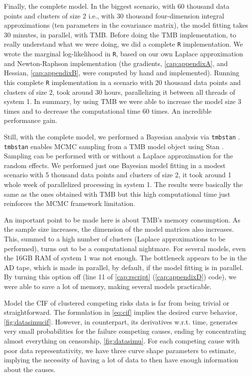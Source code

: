 Finally, the complete model. In the biggest scenario, with 60 thousand
data points and clusters of size 2 i.e., with 30 thousand four-dimension
integral approximations (ten parameters in the covariance matrix), the
model fitting takes 30 minutes, in parallel, with TMB. Before doing the
TMB implementation, to really understand what we were doing, we did a
complete \texttt{R} implementation. We wrote the marginal log-likelihood
in \texttt{R}, based on our own Laplace approximation \cite{patrao} and
Newton-Raphson implementation (the gradients, \autoref{cap:appendixA},
and Hessian, \autoref{cap:appendixB}, were computed by hand and
implemented). Running this complete \texttt{R} implementation in a
scenario with 20 thousand data points and clusters of size 2, took
around 30 hours, parallelizing it between all threads of system 1. In
summary, by using TMB we were able to increase the model size 3 times
and to decrease the computational time 60 times. An incredible
performance gain.

Still, with the complete model, we performed a Bayesian analysis via
\texttt{tmbstan} \cite{tmbstan}. \texttt{tmbstan} enables MCMC sampling
\cite{MCMC, Diaconis} from a TMB model object using Stan \cite{Stan,
RStan}. Sampling can be performed with or without a Laplace
approximation for the random effects. We performed just one Bayesian
model fitting in a modest scenario with 5 thousand data points and
clusters of size 2, it took around 1 whole week of parallelized
processing in system 1. The results were basically the same as the ones
obtained with TMB but this high computational time just reinforces the
MCMC framework limitation.

An important point to be made here is about TMB's memory consumption. As
the sample size increases, the dimension of the model matrices also
increases. This, summed to a high number of clusters (Laplace
approximations to be performed), turns out to be a computational
nightmare. For several models, even the 16GB RAM of system 1 was not
enough. The bottleneck appears to be in the AD tape, which is made in
parallel, by default, if the model fitting is in parallel. By turning
this option off (line 11 of \autoref{cap:rscript}
(\autoref{cap:appendixD}) code), we were able to save a lot of memory,
making several models practicable.

Model the CIF of clustered competing risks data is far from being
trivial or straightforward. The formulation in \autoref{eq:cif} implies
the desired curve behavior, \autoref{fig:datasimucif}. However, in
counterpart, its derivatives w.r.t. time, generates very small
probabilities for the failure competing causes, ending by concentrating
almost everything on censorship, \autoref{fig:datasimu}. For each
competing cause with poor data representativity, we have three curve
shape parameters to estimate, implying the necessity of having a lot of
data to then have enough information about the causes.

